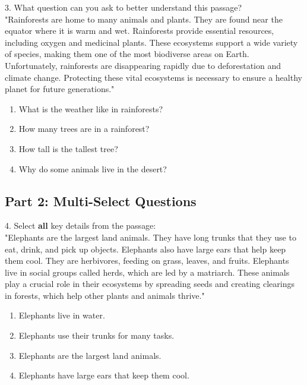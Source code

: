 \documentclass[12pt]{article}
\begin{document}
\vspace{1cm}

3. What question can you ask to better understand this passage?\\
"Rainforests are home to many animals and plants. They are found near the equator where it is warm and wet. Rainforests provide essential resources, including oxygen and medicinal plants. These ecosystems support a wide variety of species, making them one of the most biodiverse areas on Earth. Unfortunately, rainforests are disappearing rapidly due to deforestation and climate change. Protecting these vital ecosystems is necessary to ensure a healthy planet for future generations."\\
\begin{enumerate}[label=\Alph*.]
    \item What is the weather like in rainforests?
    \item How many trees are in a rainforest?
    \item How tall is the tallest tree?
    \item Why do some animals live in the desert?
\end{enumerate}




\subsection*{Part 2: Multi-Select Questions}

4. Select \textbf{all} key details from the passage:  \\
"Elephants are the largest land animals. They have long trunks that they use to eat, drink, and pick up objects. Elephants also have large ears that help keep them cool. They are herbivores, feeding on grass, leaves, and fruits. Elephants live in social groups called herds, which are led by a matriarch. These animals play a crucial role in their ecosystems by spreading seeds and creating clearings in forests, which help other plants and animals thrive."\\
\begin{enumerate}[label=\Alph*.]
    \item Elephants live in water.  
    \item Elephants use their trunks for many tasks.  
    \item Elephants are the largest land animals.  
    \item Elephants have large ears that keep them cool.  
\end{enumerate}
\end{document}
